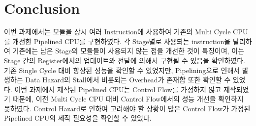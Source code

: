 \documentclass[openright, a4paper]{article}
\begin{document}

\section{Conclusion}

이번 과제에서는 모듈을 상시 여러 Instruction에 사용하여 기존의 Multi Cycle CPU를 개선한 Pipelined CPU를 구현하였다.
각 Stage별로 사용되는 instruction을 달리하여 기존에는 남은 Stage의 모듈들이 사용되지 않는 점을 개선한 것이 특징이며, 이는 Stage 간의 Register에서의 업데이트와 전달에 의해서 구현될 수 있음을 확인하였다. 
기존 Single Cycle 대비 향상된 성능을 확인할 수 있었지만, Pipelining으로 인해서 발생하는 Data Hazard의 Stall에서 비롯되는 Overhead가 존재함 또한 확인할 수 있었다. 
이번 과제에서 제작된 Pipelined CPU는 Control Flow를 가정하지 않고 제작되었기 때문에, 이전 Multi Cycle CPU 대비 Control Flow에서의 성능 개선을 확인하지 못하였다. 
Control Hazard로 인하여 고려해야 할 상황이 많은 Control Flow가 가정된 Pipelined CPU의 제작 필요성을 확인할 수 있었다.
\end{document}
